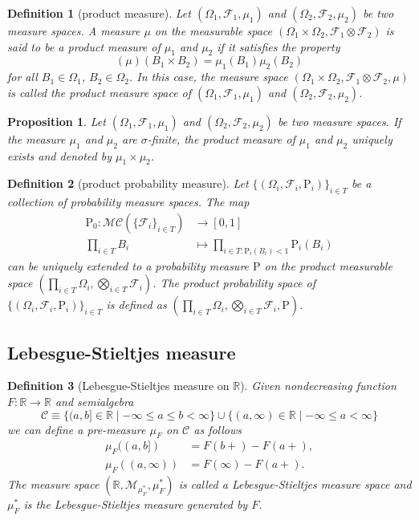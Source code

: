 \documentclass{report}
\newtheorem{definition}{Definition}[section]
\newtheorem{proposition}{Proposition}[section]
\theoremstyle{nonumberplain}
\begin{document}
\begin{definition}[product measure]
	Let $(\Omega_1,\mathcal{F}_1,\mu_1)$ and $(\Omega_2,\mathcal{F}_2,\mu_2)$ be two measure spaces. 
	A measure $\mu$ on the measurable space $(\Omega_1\times\Omega_2,\mathcal{F}_1\otimes\mathcal{F}_2)$ is said to be a \emph{product measure} of $\mu_1$ and $\mu_2$ if it satisfies the property
	\[
	\left(\mu\right)\left(B_{1} \times B_{2}\right)=\mu_{1}\left(B_{1}\right) \mu_{2}\left(B_{2}\right)
	\]
	for all $B_1\in\Omega_1$, $B_2\in\Omega_2$. In this case, the measure space $(\Omega_1\times\Omega_2,\mathcal{F}_1\otimes\mathcal{F}_2,\mu)$ is called the product measure space of $(\Omega_1,\mathcal{F}_1,\mu_1)$ and $(\Omega_2,\mathcal{F}_2,\mu_2)$.
\end{definition}

\begin{proposition}
	Let $(\Omega_1,\mathcal{F}_1,\mu_1)$ and $(\Omega_2,\mathcal{F}_2,\mu_2)$ be two measure spaces. If the measure $\mu_1$ and $\mu_2$ are $\sigma$-finite, the product measure of $\mu_1$ and $\mu_2$ uniquely exists and denoted by $\mu_1\times\mu_2$.
\end{proposition}

\begin{definition}[product probability measure]
	Let $\{(\Omega_i,\mathcal{F}_i,\mathrm{P}_i)\}_{i\in T}$ be a collection of probability measure spaces. 
	The map 
	\begin{align*}
	\mathrm{P}_0: \mathcal{MC}(\{\mathcal{F}_i\}_{i\in T})&\longrightarrow[0,1]\\
	\prod_{i\in T}B_i&\longmapsto\prod_{i\in T: \mathrm{P}_i(B_i)<1}\mathrm{P}_i\left(B_i\right)
	\end{align*}
	can be uniquely extended to a probability measure $\mathrm{P}$ on the product measurable space $\left(\prod_{i\in T}\Omega_i,\bigotimes_{i\in T}\mathcal{F}_i\right)$. The \emph{product probability space} of $\{(\Omega_i,\mathcal{F}_i,\mathrm{P}_i)\}_{i\in T}$ is defined as $\left(\prod_{i\in T}\Omega_i,\bigotimes_{i\in T}\mathcal{F}_i,\mathrm{P}\right)$.
\end{definition}

\subsection{Lebesgue-Stieltjes measure}
\begin{definition}[Lebesgue-Stieltjes measure on $\mathbb{R}$]
 Given nondecreasing function $F: \mathbb{R} \rightarrow \mathbb{R}$ and semialgebra
 \[
 \mathcal{C} \equiv\{(a, b]\in\mathbb{R}\mid-\infty \leq a \leq b<\infty\} \cup\{(a, \infty)\in\mathbb{R}\mid-\infty \leq a<\infty\}
 \]
 we can define a pre-measure $\mu_F$ on $\mathcal{C}$ as follows
 \[
	\begin{aligned}
	\mu_{F}((a, b]) &=F(b+)-F(a+), \\
	\mu_{F}((a, \infty)) &=F(\infty)-F(a+).
	\end{aligned}
 \]
 The measure space $\left(\mathbb{R}, \mathcal{M}_{\mu_{F}^{*}}, \mu_{F}^{*}\right)$ is called a \emph{Lebesgue-Stieltjes measure space} and $\mu_{F}^{*}$ is the \emph{Lebesgue-Stieltjes measure} generated by $F$.
\end{definition}
\end{document}
